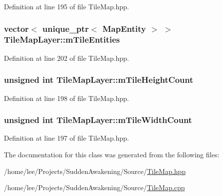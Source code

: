 Definition at line 195 of file Tile\-Map.\-hpp.

\hypertarget{class_tile_map_layer_a9c9c569f4c2f5de09b5541d079f5f97a}{
\subsubsection[{m\-Tile\-Entities}]{\setlength{\rightskip}{0pt plus 5cm}vector$<$ unique\-\_\-ptr$<$ {\bf Map\-Entity} $>$ $>$ Tile\-Map\-Layer\-::m\-Tile\-Entities\hspace{0.3cm}{\ttfamily [protected]}}}\label{class_tile_map_layer_a9c9c569f4c2f5de09b5541d079f5f97a}


Definition at line 202 of file Tile\-Map.\-hpp.

\hypertarget{class_tile_map_layer_ad3731c3f3e38579327eb1a6b40e74af3}{
\subsubsection[{m\-Tile\-Height\-Count}]{\setlength{\rightskip}{0pt plus 5cm}unsigned int Tile\-Map\-Layer\-::m\-Tile\-Height\-Count\hspace{0.3cm}{\ttfamily [protected]}}}\label{class_tile_map_layer_ad3731c3f3e38579327eb1a6b40e74af3}


Definition at line 198 of file Tile\-Map.\-hpp.

\hypertarget{class_tile_map_layer_a1f7ed47471eae14e321db6e2da4d0547}{
\subsubsection[{m\-Tile\-Width\-Count}]{\setlength{\rightskip}{0pt plus 5cm}unsigned int Tile\-Map\-Layer\-::m\-Tile\-Width\-Count\hspace{0.3cm}{\ttfamily [protected]}}}\label{class_tile_map_layer_a1f7ed47471eae14e321db6e2da4d0547}


Definition at line 197 of file Tile\-Map.\-hpp.



The documentation for this class was generated from the following files\-:\begin{DoxyCompactItemize}
\item 
/home/lee/\-Projects/\-Sudden\-Awakening/\-Source/\hyperlink{_tile_map_8hpp}{Tile\-Map.\-hpp}\item 
/home/lee/\-Projects/\-Sudden\-Awakening/\-Source/\hyperlink{_tile_map_8cpp}{Tile\-Map.\-cpp}\end{DoxyCompactItemize}
